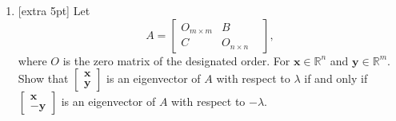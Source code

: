 \documentclass{article}
\newcommand{\bx}{\mathbf{x}}
\newcommand{\by}{\mathbf{y}}
\begin{document}
\begin{enumerate}
\item{} [extra 5pt] Let 
\[A = \begin{bmatrix}
 O_{m\times m} & B & \\
 C & O_{n\times n} 
\end{bmatrix},\]
where $O$ is the zero matrix of the designated order.  For $\bx\in\mathbb{R}^n$ and $\by\in\mathbb{R}^m$.  Show that $\begin{bmatrix} \bx \\ \by \end{bmatrix}$ is an eigenvector of $A$ with respect to $\lambda$ if and only if $\begin{bmatrix} \bx \\ -\by \end{bmatrix}$ is an eigenvector of $A$ with respect to $-\lambda$.
\end{enumerate}
\end{document}
